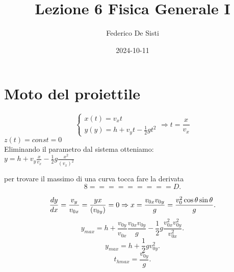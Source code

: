 \documentclass[12px]{article}
\title{Lezione 6 Fisica Generale I}
\date{2024-10-11}
\author{Federico De Sisti}
\begin{document}
	\maketitle
	\newpage
	\section{Moto del proiettile}
	\[\begin{cases}
		x(t) = v_xt\\
		y(y) = h + v_yt - \frac 12 g t^2
	\end{cases} \Rightarrow t = \frac {x}{v_x}
\]
	$z(t) = const = 0$\\
	Eliminando il parametro dal sistema otteniamo:\\
	$ y = h + v_y \frac {x}{v_x} - \frac 12 g \frac {x^2}{(v_x)^2}$
	\begin{teo}
		per trovare il massimo di una curva tocca fare la derivata 
		\[
		8=========D
		.\] 
	\end{teo}
	\[
		\frac{d y}{d x} = \frac {v_y}{v_{0x}} = \frac {yx}{(v_{0y})} = 0 \Rightarrow x = \frac {v_{0x} v_{0y}}{g} = \frac{ v_0^2\cos\theta\sin\theta} {g}
	.\] 
	\[
		y_{max} = h + \frac {v_{0y}}{v_{0x}}\frac {v_{0x}v_{0y}}{g} - \frac 12 g \frac {v_{0x}^2 v_{0y}^2}{v_{0x}^2}
	.\] 
	\[
		y_{max}=h + \frac 12 g v_{0y}^2
	.\] 
	\[
		t_{hmax} = \frac {v_{0y}} g
	.\] 
	
\end{document}

